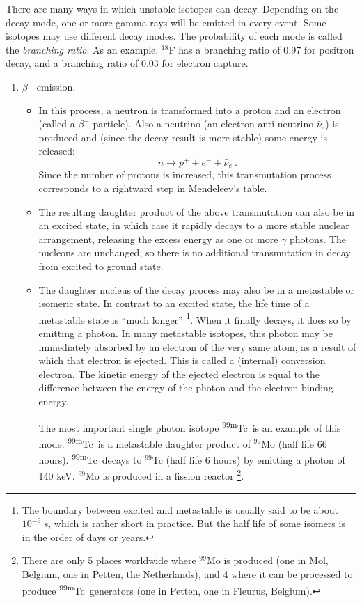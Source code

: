 \documentclass[11pt,oneside]{book}
\begin{document}
There are many ways in which unstable isotopes can decay. Depending on
the decay mode, one or more gamma rays will be emitted in every
event. Some isotopes may use different decay modes. The probability of
each mode is called the {\em branching ratio}. As an example, $^{18}$F
has a branching ratio of 0.97 for positron decay, and a branching
ratio of 0.03 for electron capture.
\begin{enumerate}

\item $\beta^-$ emission.
%
\begin{itemize}
\item
In this process, a neutron is transformed into a proton and an
electron (called a $\beta^-$ particle).  Also a neutrino (an electron
anti-neutrino $\bar\nu_e$) is produced and (since the decay result is
more stable) some energy is released:
\begin{equation}
 n \rightarrow p^+ + e^- + \bar\nu_e \ .
\end{equation}
Since the number of protons is increased, this transmutation process
corresponds to a rightward step in Mendeleev's table.

\item
The resulting daughter product of the above transmutation can also be in an
excited state, in which case it rapidly decays to a more stable nuclear
arrangement, releasing the excess energy as one or more $\gamma$ photons.  The
nucleons are unchanged, so there is no additional transmutation in decay from
excited to ground state.

\item
The daughter nucleus of the decay process may also be in a metastable or
isomeric state. In contrast to an excited state, the life time of a metastable
state is ``much longer''
\footnote{The boundary between excited and metastable is usually said
  to be about $10^{-9}$ s, which is rather short in practice. But the
  half life of some isomers is in the order of days or years.}.  
%
When it finally decays, it does so by emitting a photon. In many
metastable isotopes, this photon may be immediately absorbed by an
electron of the very same atom, as a result of which that electron is
ejected.  This is called a (internal) conversion electron. The kinetic
energy of the ejected electron is equal to the difference between the
energy of the photon and the electron binding energy. 

The most important single photon isotope \textsuperscript{99m}Tc\ is an example of this
mode. \textsuperscript{99m}Tc\ is a metastable daughter product of $^{99}$Mo (half life 66
hours). \textsuperscript{99m}Tc\ decays to $^{99}$Tc (half life 6 hours) by emitting a
photon of 140 keV. $^{99}$Mo is produced in a fission reactor
\footnote{There are only 5 places worldwide where $^{99}$Mo is
  produced (one in Mol, Belgium, one in Petten, the Netherlands), and
  4 where it can be processed to produce \textsuperscript{99m}Tc\ generators (one in
  Petten, one in Fleurus, Belgium).}.
\end{itemize}


\end{enumerate}
\end{document}
